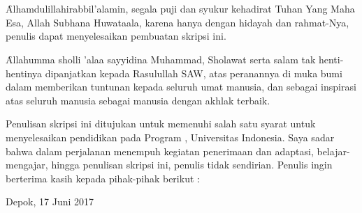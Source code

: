 \chapter*{\kataPengantar}
\f{Alhamdulillahirabbil'alamin}, segala puji dan syukur kehadirat Tuhan Yang Maha Esa, Allah Subhana Huwataala, karena hanya dengan hidayah dan rahmat-Nya, penulis dapat menyelesaikan pembuatan skripsi ini.

\f{Allahumma sholli 'alaa sayyidina Muhammad}, Sholawat serta salam tak henti-hentinya dipanjatkan kepada Rasulullah SAW, atas peranannya di muka bumi dalam memberikan tuntunan kepada seluruh umat manusia, dan sebagai inspirasi atas seluruh manusia sebagai manusia dengan akhlak terbaik.

Penulisan skripsi ini ditujukan untuk memenuhi salah satu syarat untuk menyelesaikan pendidikan pada Program \gelar, Universitas Indonesia. Saya sadar bahwa dalam perjalanan menempuh kegiatan penerimaan dan adaptasi, belajar-mengajar, hingga penulisan skripsi ini, penulis tidak sendirian. Penulis ingin berterima kasih kepada pihak-pihak berikut : 

\vspace*{0.1cm}
\begin{flushright}
Depok, 17 Juni 2017\\[0.1cm]
\vspace*{1cm}
\penulis

\end{flushright}